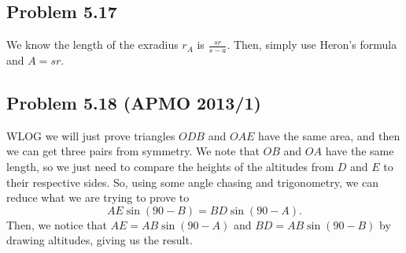 \documentclass{scrartcl}
\begin{document}
\subsection*{Problem 5.17}
We know the length of the exradius $r_A$ is $\frac{sr}{s-a}$. Then, simply use Heron's formula and $A = sr$.
\subsection*{Problem 5.18 (APMO 2013/1)}
WLOG we will just prove triangles $ODB$ and $OAE$ have the same area, and then we can get three pairs from symmetry. We note that $OB$ and $OA$ have the same length, so we just need to compare the heights of the altitudes from $D$ and $E$ to their respective sides. So, using some angle chasing and trigonometry, we can reduce what we are trying to prove to
\[
    AE \sin (90 - B) = BD \sin (90 - A).
\]
Then, we notice that $AE = AB \sin (90 - A)$ and $BD = AB \sin (90 - B)$ by drawing altitudes, giving us the result.
\end{document}
